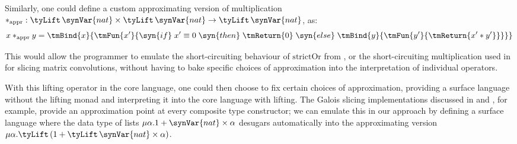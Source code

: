   \begin{center}
    \tikzset{node distance=1cm}
  \end{center}

Similarly, one could define a custom approximating version of multiplication $*_{\text{appr}}:
\tyLift\,\synVar{nat} \times \tyLift\,\synVar{nat} \to \tyLift\,\synVar{nat}$, as:
\[x *_{\text{appr}} y = \tmBind{x}{\tmFun{x'}{\syn{if}\;x' \equiv
0\;\syn{then}\;\tmReturn{0}\;\syn{else}\;\tmBind{y}{\tmFun{y'}{\tmReturn{x' * y'}}}}}\]

\noindent This would allow the programmer to emulate the short-circuiting behaviour of $\mathrm{strictOr}$
from , or the short-circuiting multiplication used in \citet{perera22} for slicing
matrix convolutions, without having to bake specific choices of approximation into the interpretation of
individual operators.

With this lifting operator in the core language, one could then choose to fix certain choices of
approximation, providing a surface language without the lifting monad and interpreting it into the core
language with lifting. The Galois slicing implementations discussed in \citet{perera12a} and
\citet{ricciotti17}, for example, provide an approximation point at every composite type constructor; we can
emulate this in our approach by defining a surface language where the data type of lists $\mu\alpha.1 +
\synVar{nat} \times \alpha$ desugars automatically into the approximating version $\mu\alpha.\tyLift\,(1 +
\tyLift\,\synVar{nat} \times \alpha)$.

